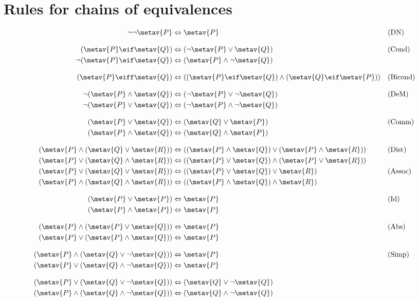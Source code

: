 \section{Rules for chains of equivalences}

\ifHTMLtarget
\begin{align*}
\lnot\lnot \metav{P} & \Leftrightarrow \metav{P} && \text{(DN)}\\[2ex]
(\metav{P} \eif \metav{Q}) & \Leftrightarrow (\lnot \metav{P} \lor \metav{Q})
&& \text{(Cond)}\\
\lnot(\metav{P} \eif \metav{Q}) & \Leftrightarrow (\metav{P} \land \lnot\metav{Q}) \\[2ex]
(\metav{P} \eiff \metav{Q}) & \Leftrightarrow ((\metav{P} \eif \metav{Q}) \land  (\metav{Q} \eif \metav{P}))
&& \text{(Bicond)}\\[2ex]
\lnot(\metav{P} \land \metav{Q}) & \Leftrightarrow (\lnot\metav{P} \lor \lnot\metav{Q})
&& \text{(DeM)}\\
\lnot(\metav{P} \lor \metav{Q}) & \Leftrightarrow (\lnot\metav{P} \land \lnot\metav{Q}) \\[2ex]
(\metav{P} \lor \metav{Q}) & \Leftrightarrow (\metav{Q} \lor \metav{P}) & &\text{(Comm)}\\
(\metav{P} \land \metav{Q}) & \Leftrightarrow (\metav{Q} \land \metav{P})\\[2ex]
(\metav{P} \land (\metav{Q} \lor \metav{R})) & \Leftrightarrow ((\metav{P} \land \metav{Q}) \lor (\metav{P} \land \metav{R}))
&& \text{(Dist)}\\
(\metav{P} \lor (\metav{Q} \land \metav{R})) & \Leftrightarrow ((\metav{P} \lor \metav{Q}) \land (\metav{P} \lor \metav{R}))\\
(\metav{P} \lor (\metav{Q} \lor \metav{R})) & \Leftrightarrow ((\metav{P} \lor \metav{Q}) \lor \metav{R}) & &\text{(Assoc)}\\
(\metav{P} \land (\metav{Q} \land \metav{R})) & \Leftrightarrow ((\metav{P} \land \metav{Q}) \land \metav{R})\\[2ex]
(\metav{P} \lor \metav{P}) & \Leftrightarrow \metav{P} && \text{(Id)}\\
(\metav{P} \land \metav{P}) & \Leftrightarrow \metav{P}\\[2ex]
(\metav{P} \land (\metav{P} \lor \metav{Q})) & \Leftrightarrow \metav{P}&& \text{(Abs)}\\
(\metav{P} \lor (\metav{P} \land \metav{Q})) & \Leftrightarrow \metav{P}\\[2ex]
(\metav{P} \land (\metav{Q} \lor \lnot\metav{Q})) & \Leftrightarrow \metav{P}  && \text{(Simp)}\\
(\metav{P} \lor (\metav{Q} \land \lnot\metav{Q})) & \Leftrightarrow \metav{P}\\[2ex]
(\metav{P} \lor (\metav{Q} \lor \lnot\metav{Q})) & \Leftrightarrow (\metav{Q} \lor \lnot\metav{Q}) \\
(\metav{P} \land (\metav{Q} \land \lnot\metav{Q})) & \Leftrightarrow (\metav{Q} \land \lnot\metav{Q})
\end{align*}
\else

